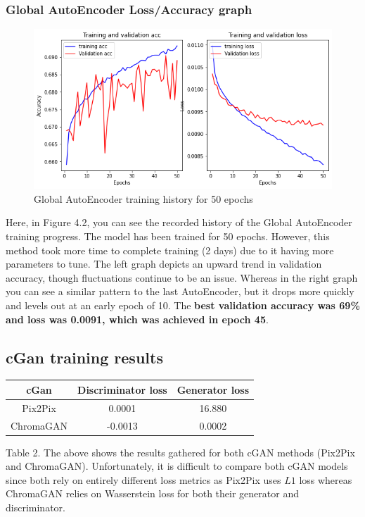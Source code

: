 \subsubsection*{Global AutoEncoder Loss/Accuracy graph}
\begin{figure}[H]
    \centering
    \includegraphics[width=0.7\columnwidth]{sections/figures/autoencoder2_history_loss.png}
    \caption{Global AutoEncoder training history for 50 epochs}
    \label{fig:my_label}
\end{figure}
Here, in Figure 4.2, you can see the recorded history of the Global AutoEncoder training progress. The model has been trained for 50 epochs. However, this method took more time to complete training (2 days) due to it having more parameters to tune. The left graph depicts an upward trend in validation accuracy, though fluctuations continue to be an issue. Whereas in the right graph you can see a similar pattern to the last AutoEncoder, but it drops more quickly and levels out at an early epoch of 10. The \textbf{best validation accuracy was 69\% and loss was 0.0091, which was achieved in epoch 45}.
\subsection{cGan training results}


\begin{center}
\begin{tabular}{||c c c||} 
 \hline
  cGan & Discriminator loss & Generator loss \\ [0.5ex] 
 \hline\hline
 Pix2Pix & 0.0001 & 16.880\\ 
 \hline
 ChromaGAN & -0.0013 & 0.0002\\
 \hline

\end{tabular}
\end{center}
Table 2. The above shows the results gathered for both cGAN methods (Pix2Pix and ChromaGAN). Unfortunately, it is difficult to compare both cGAN models since both rely on entirely different loss metrics as Pix2Pix uses \(L1\) loss whereas ChromaGAN relies on Wasserstein loss for both their generator and discriminator. 

